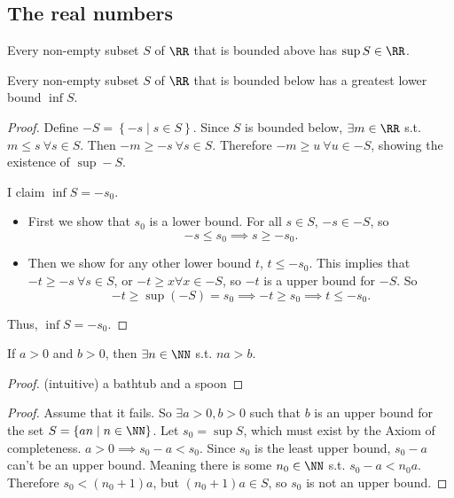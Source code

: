 \documentclass[11pt]{scrartcl}
\numberwithin{equation}{section}
\begin{document}
\subsection{The real numbers}
\begin{axiom}
    Every non-empty subset $S$ of $\RR$ that is bounded above has 
    $\sup S \in \RR$.
\end{axiom}
\begin{corollary}
    Every non-empty subset $S$ of $\RR$ that is bounded below has 
    a greatest lower bound $\inf S$.
\end{corollary}
\begin{proof}
    Define $-S = \left\{-s \mid s \in S\right\}$. Since $S$ is bounded below,
    $\exists m \in \RR$ s.t. $m\leq s \ \forall s \in S$.
    Then $-m\geq -s \ \forall s \in S$. Therefore $-m \geq u \ \forall u \in -S$, showing the existence of $\sup -S$.

    I claim $\inf S = -s_0$. 
    \begin{itemize}
        \item First we show that $s_0$ is a lower bound. 
        For all $s\in S$, $-s\in -S$, so 
        \[
            -s\leq s_0 \implies s\geq -s_0.
        \]

        \item Then we show for any other lower bound $t$, $t\leq -s_0$. 
        This implies that $-t\geq -s \ \forall s\in S$, or $-t\geq x \forall x \in -S$, so $-t$ is a upper bound for $-S$.
        So 
        \[ 
            -t\geq\sup(-S) = s_0 \implies -t\geq s_0 \implies t \leq -s_0. 
        \]
    \end{itemize}
    Thus, $\inf S = -s_0$.
\end{proof}
\begin{proposition}
    \label{prop:archprop}
    If $a>0$ and $b>0$, then $\exists n\in\NN$ s.t. $na > b$.
\end{proposition}
\begin{proof}
    (intuitive)
    a bathtub and a spoon
\end{proof}
\begin{proof}
    Assume that it fails. So $\exists a>0, b>0$ such that 
    $b$ is an upper bound for the set 
    $S = \left\{an \mid n \in \NN\right\}$.
    Let $s_0 = \sup S$, which must exist by the Axiom of completeness.
    $a>0 \implies s_0-a<s_0$. Since $s_0$ is the least upper bound, $s_0-a$
    can't be an upper bound. Meaning there is some $n_0\in\NN$ s.t. 
    $s_0-a<n_0a$. Therefore $s_0 <(n_0+1)a$, but 
    $(n_0+1)a \in S$, so $s_0$ is not an upper bound.
\end{proof}
\end{document}
